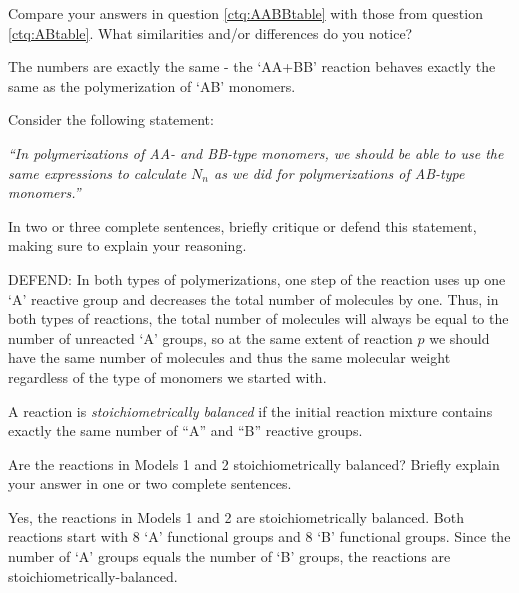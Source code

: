 \begin{activity}
\begin{ctqs}
		\question Compare your answers in question \ref{ctq:AABBtable} with those from question \ref{ctq:ABtable}.  What similarities and/or differences do you notice?
		
			\begin{solution}[1in]
				The numbers are exactly the same - the `AA+BB' reaction behaves exactly the same as the polymerization of `AB' monomers.
			\end{solution}
		
		\question Consider the following statement:
		
			\emph{``In polymerizations of AA- and BB-type monomers, we should be able to use the same expressions to calculate $N_n$ as we did for polymerizations of AB-type monomers.''}
			
			In two or three complete sentences, briefly critique or defend this statement, making sure to explain your reasoning.
		
			\begin{solution}[1.5in]
				DEFEND: In both types of polymerizations, one step of the reaction uses up one `A' reactive group and decreases the total number of molecules by one. Thus, in both types of reactions, the total number of molecules will always be equal to the number of unreacted `A' groups, so at the same extent of reaction $p$ we should have the same number of molecules and thus the same molecular weight regardless of the type of monomers we started with.
			\end{solution}
			
\end{ctqs}
	
\begin{infobox}

A reaction is \emph{stoichiometrically balanced} if the initial reaction mixture contains exactly the same number of ``A'' and ``B'' reactive groups.

\end{infobox}
	
\begin{ctqs}
		\question Are the reactions in Models 1 and 2 stoichiometrically balanced?  Briefly explain your answer in one or two complete sentences.
		
		\begin{solution}[1in]
			Yes, the reactions in Models 1 and 2 are stoichiometrically balanced.  Both reactions start with 8 `A' functional groups and 8 `B' functional groups.  Since the number of `A' groups equals the number of `B' groups, the reactions are stoichiometrically-balanced.
		\end{solution}
		

\end{ctqs}
\end{activity}
